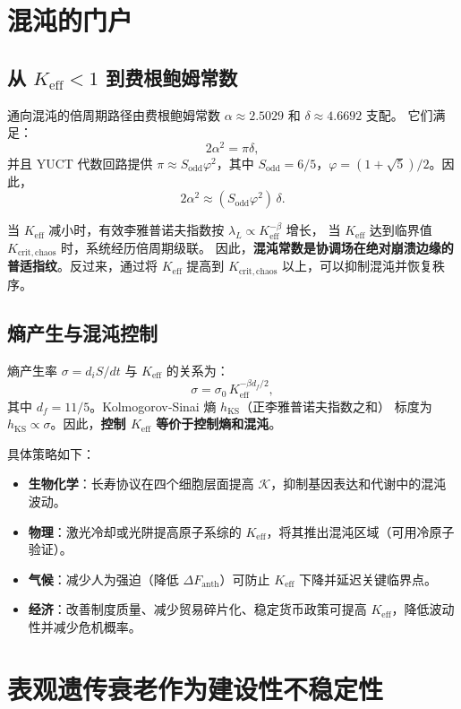 \documentclass[12pt,a4paper]{article}
\newcommand{\Keff}{K_{\mathrm{eff}}}
\newcommand{\REL}{\mathcal{K}}
\begin{document}
	\section{混沌的门户}
	
	\subsection{从 $\Keff < 1$ 到费根鲍姆常数}
	
	通向混沌的倍周期路径由费根鲍姆常数 $\alpha \approx 2.5029$ 和 $\delta \approx 4.6692$ 支配。
	它们满足：
	\[
	2\alpha^2 = \pi \delta,
	\]
	并且 YUCT 代数回路提供 $\pi \approx S_{\mathrm{odd}}\varphi^2$，其中
	$S_{\mathrm{odd}}=6/5$，$\varphi = (1+\sqrt{5})/2$。因此，
	\[
	2\alpha^2 \approx (S_{\mathrm{odd}}\varphi^2)\,\delta.
	\]
	
	当 $\Keff$ 减小时，有效李雅普诺夫指数按 $\lambda_L \propto \Keff^{-\beta}$ 增长，
	当 $\Keff$ 达到临界值 $K_{\mathrm{crit,chaos}}$ 时，系统经历倍周期级联。
	因此，\textbf{混沌常数是协调场在绝对崩溃边缘的普适指纹}。反过来，通过将 $\Keff$
	提高到 $K_{\mathrm{crit,chaos}}$ 以上，可以抑制混沌并恢复秩序。
	
	\subsection{熵产生与混沌控制}
	
	熵产生率 $\sigma = d_iS/dt$ 与 $\Keff$ 的关系为：
	\[
	\sigma = \sigma_0\, \Keff^{-\beta d_f/2},
	\]
	其中 $d_f = 11/5$。Kolmogorov‑Sinai 熵 $h_{\mathrm{KS}}$（正李雅普诺夫指数之和）
	标度为 $h_{\mathrm{KS}} \propto \sigma$。因此，\textbf{控制 $\Keff$ 等价于控制熵和混沌}。
	
	具体策略如下：
	\begin{itemize}
		\item \textbf{生物化学}：长寿协议在四个细胞层面提高 $\REL$，抑制基因表达和代谢中的混沌波动。
		\item \textbf{物理}：激光冷却或光阱提高原子系综的 $\Keff$，将其推出混沌区域（可用冷原子验证）。
		\item \textbf{气候}：减少人为强迫（降低 $\Delta F_{\mathrm{anth}}$）可防止 $\Keff$ 下降并延迟关键临界点。
		\item \textbf{经济}：改善制度质量、减少贸易碎片化、稳定货币政策可提高 $\Keff$，降低波动性并减少危机概率。
	\end{itemize}
	
	\section{表观遗传衰老作为建设性不稳定性}
	
\end{document}
